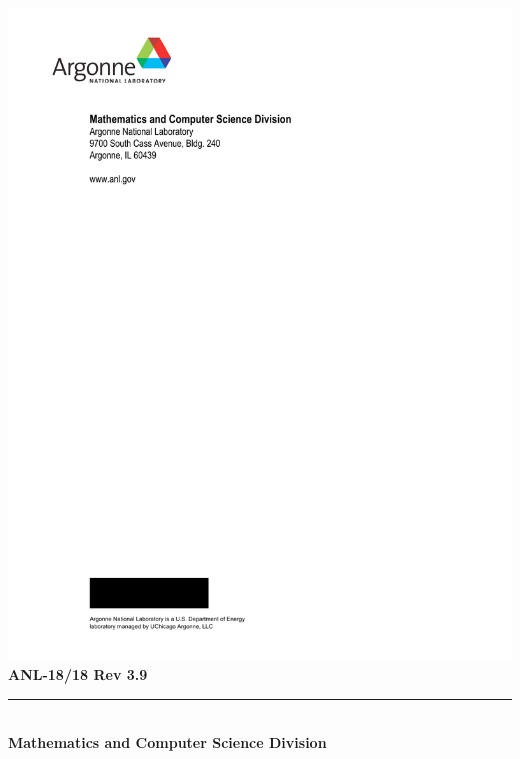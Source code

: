 
%



\def\shortintro{false}

\usepackage{fancyhdr,lastpage}
\pagestyle{fancy}



\pagestyle{empty}
\hspace{-.65in}\includegraphics{ArgonneLogo}
\hfill  {\large {\bf ANL-18/18 Rev 3.9}}

\vspace*{2in}
\vspace*{8pt}
\hrule
\vspace*{8pt}

\vspace*{1in}
\noindent \\
{\Large {\bf Mathematics and Computer Science Division}}

